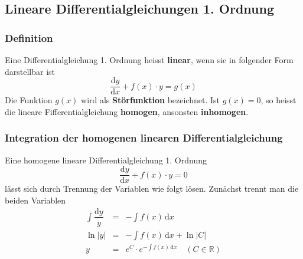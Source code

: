 \subsection{Lineare Differentialgleichungen 1. Ordnung}
\subsubsection{Definition}
Eine Differentialgleichung 1. Ordnung heisst \textbf{linear}, wenn sie in folgender Form darstellbar ist
\begin{equation}
\boxed{\dfrac{\text{d}y}{\text{d}x}+f\left(x\right)\cdot y=g\left(x\right)}
\end{equation}
Die Funktion $g\left(x\right)$ wird als \textbf{Störfunktion} bezeichnet. Ist $g\left(x\right)=0$, so heisst die lineare Fifferentialgleichung \textbf{homogen}, ansonsten \textbf{inhomogen}.
\subsubsection{Integration der homogenen linearen Differentialgleichung}
Eine homogene lineare Differentialgleichung 1. Ordnung
\begin{equation}
\boxed{\dfrac{\text{d}y}{\text{d}x}+f\left(x\right)\cdot y=0}
\end{equation}
lässt sich durch Trennung der Variablen wie folgt lösen. Zunächst trennt man die beiden Variablen
\begin{equation}
\boxed{
\begin{array}{lll}
\displaystyle \int\dfrac{\text{d}y}{y}&=&-\displaystyle \int f\left(x\right)\, \text{d}x\\
\ln\Big\vert y\Big\vert&=&-\displaystyle \int f\left(x\right)\, \text{d}x+\ln\Big\vert C\Big\vert\\
y&=&e^C\cdot e^{-\displaystyle \int f\left(x\right)\,\text{d}x}\quad \left(C\in \mathbb{R}\right)
\end{array}
}
\end{equation}
